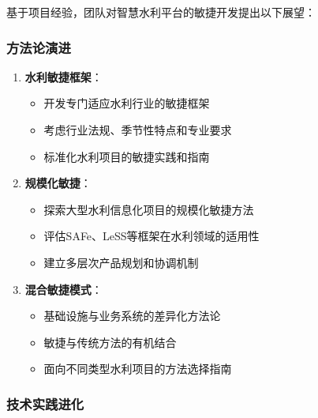 基于项目经验，团队对智慧水利平台的敏捷开发提出以下展望：

\subsubsection{方法论演进}\label{ux65b9ux6cd5ux8bbaux6f14ux8fdb}

\begin{enumerate}
\def\labelenumi{\arabic{enumi}.}
\tightlist
\item
  \textbf{水利敏捷框架}：

  \begin{itemize}
  \tightlist
  \item
    开发专门适应水利行业的敏捷框架
  \item
    考虑行业法规、季节性特点和专业要求
  \item
    标准化水利项目的敏捷实践和指南
  \end{itemize}
\item
  \textbf{规模化敏捷}：

  \begin{itemize}
  \tightlist
  \item
    探索大型水利信息化项目的规模化敏捷方法
  \item
    评估SAFe、LeSS等框架在水利领域的适用性
  \item
    建立多层次产品规划和协调机制
  \end{itemize}
\item
  \textbf{混合敏捷模式}：

  \begin{itemize}
  \tightlist
  \item
    基础设施与业务系统的差异化方法论
  \item
    敏捷与传统方法的有机结合
  \item
    面向不同类型水利项目的方法选择指南
  \end{itemize}
\end{enumerate}

\subsubsection{技术实践进化}\label{ux6280ux672fux5b9eux8df5ux8fdbux5316}


